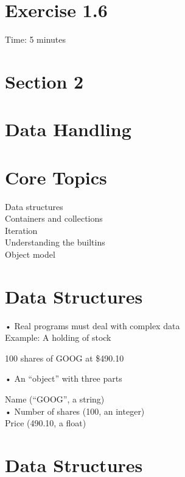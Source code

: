 \documentclass[
  letterpaper,
  DIV=11,
  numbers=noendperiod]{scrreprt}
\begin{document}
\chapter{Exercise 1.6}\label{exercise-1.6}

Time: 5 minutes


\chapter{Section 2}\label{section-2}


\chapter{Data Handling}\label{data-handling}


\chapter{Core Topics}\label{core-topics}

Data structures\\
Containers and collections\\
Iteration\\
Understanding the builtins\\
Object model


\chapter{Data Structures}\label{data-structures}

• Real programs must deal with complex data\\
Example: A holding of stock

100 shares of GOOG at \$490.10

• An ``object'' with three parts

Name (``GOOG'', a string)\\
• Number of shares (100, an integer)\\
Price (490.10, a float)


\chapter{Data Structures}\label{data-structures-1}
\end{document}
